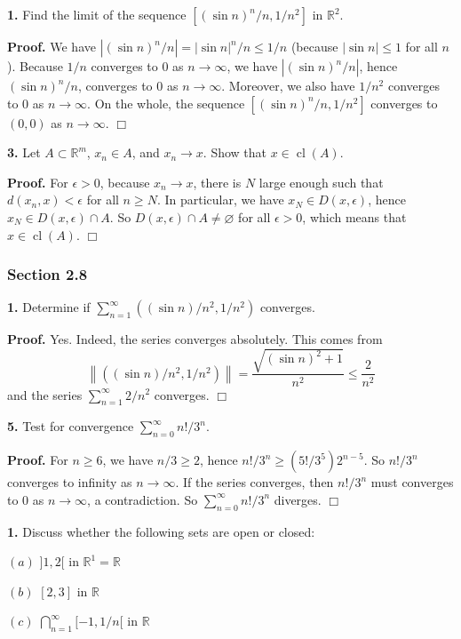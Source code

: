 \documentclass{article}
\begin{document}
    \textbf{1.} Find the limit of the sequence $[(\sin n)^n/n, 1/n^2]$ in
$\mathbb{R}^2$.

\textbf{Proof.} We have $|(\sin n)^n/n| = |\sin n|^n/n \leq 1/n$
(because $|\sin n| \leq 1$ for all $n$). Because $1/n$ converges to $0$
as $n \to \infty$, we have $|(\sin n)^n/n|$, hence $(\sin n)^n/n$,
converges to $0$ as $n \to \infty$. Moreover, we also have $1/n^2$
converges to $0$ as $n\to \infty$. On the whole, the sequence
$[(\sin n)^n/n, 1/n^2]$ converges to $(0,0)$ as $n\to \infty$. $\Box$

    \textbf{3.} Let $A\subset \mathbb{R}^m$, $x_n\in A$, and $x_n \to x$.
Show that $x\in \operatorname{cl}(A)$.

\textbf{Proof.} For $\epsilon > 0$, because $x_n \to x$, there is $N$
large enough such that $d(x_n, x) < \epsilon$ for all $n\ge N$. In
particular, we have $x_N \in D(x, \epsilon)$, hence
$x_N \in D(x, \epsilon)\cap A$. So
$D(x, \epsilon)\cap A \neq \varnothing$ for all $\epsilon > 0$, which
means that $x\in \operatorname{cl}(A)$. $\Box$

    \subsubsection*{Section 2.8}\label{section-2.8}

    \textbf{1.} Determine if $\sum_{n=1}^{\infty}((\sin n)/n^2,1/n^2)$
converges.

\textbf{Proof.} Yes. Indeed, the series converges absolutely. This comes
from
\[\left\|((\sin n)/n^2,1/n^2)\right\| = \frac{\sqrt{(\sin n)^2 + 1}}{n^2} \le \frac{2}{n^2}\]
and the series $\sum_{n=1}^{\infty}2/n^2$ converges. $\Box$

    \textbf{5.} Test for convergence $\sum_{n=0}^{\infty}n!/3^n$.

\textbf{Proof.} For $n \ge 6$, we have $n/3 \ge 2$, hence
$n!/3^n \ge (5!/3^5)2^{n-5}$. So $n!/3^n$ converges to infinity as
$n\to \infty$. If the series converges, then $n!/3^n$ must converges to
$0$ as $n\to \infty$, a contradiction. So $\sum_{n=0}^{\infty}n!/3^n$
diverges. $\Box$

    \textbf{1.} Discuss whether the following sets are open or closed:

$(a)$ $]1,2[$ in $\mathbb{R}^1=\mathbb{R}$

$(b)$ $[2,3]$ in $\mathbb{R}$

$(c)$ $\bigcap_{n=1}^{\infty}[-1,1/n[$ in $\mathbb{R}$
\end{document}
